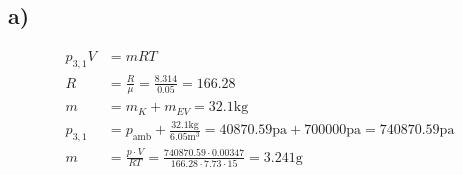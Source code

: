 

\subsection*{a)}
\begin{align*}
    p_{3,1} V &= mRT \\
    R &= \frac{R}{\mu} = \frac{8.314}{0.05} = 166.28 \\
    m &= m_K + m_{EV} = 32.1 \text{kg} \\
    p_{3,1} &= p_{\text{amb}} + \frac{32.1 \text{kg}}{6.05 \text{m}^3} = 40870.59 \text{pa} + 700000 \text{pa} = 740870.59 \text{pa} \\
    m &= \frac{p \cdot V}{RT} = \frac{740870.59 \cdot 0.00347}{166.28 \cdot 7.73 \cdot 15} = 3.241 \text{g}
\end{align*}